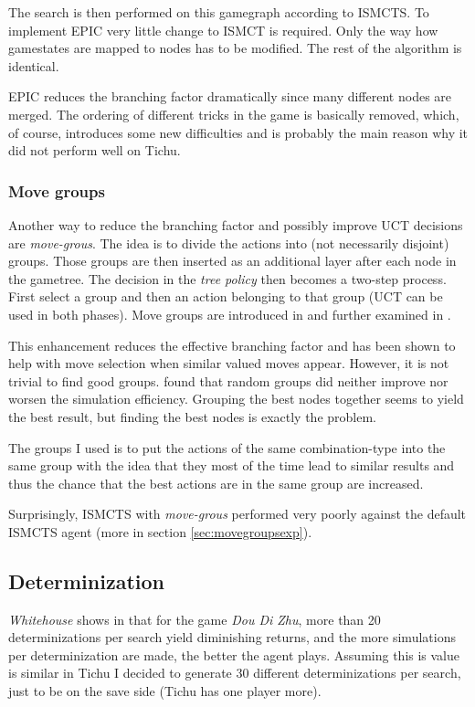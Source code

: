 The search is then performed on this gamegraph according to ISMCTS. To implement EPIC very little change to ISMCT is required. Only the way how gamestates are mapped to nodes has to be modified. The rest of the algorithm is identical.

EPIC reduces the branching factor dramatically since many different nodes are merged. The ordering of different tricks in the game is basically removed, which, of course, introduces some new difficulties and is probably the main reason why it did not perform well on Tichu.

\subsubsection{Move groups}
Another way to reduce the branching factor and possibly improve UCT decisions are \textit{move-grous}.
The idea is to divide the actions into (not necessarily disjoint) groups. Those groups are then inserted as an additional layer after each node in the gametree.
The decision in the \textit{tree policy} then becomes a two-step process. First select a group and then an action belonging to that group (UCT can be used in both phases).
Move groups are introduced in \cite{movegroups} and further examined in \cite{movegroups2}.

This enhancement reduces the effective branching factor and has been shown to help with move selection when similar valued moves appear. However, it is not trivial to find good groups. \cite{movegroups2} found that random groups did neither improve nor worsen the simulation efficiency. Grouping the best nodes together seems to yield the best result, but finding the best nodes is exactly the problem.

The groups I used is to put the actions of the same combination-type into the same group with the idea that they most of the time lead to similar results and thus the chance that the best actions are in the same group are increased.

Surprisingly, ISMCTS with \textit{move-grous} performed very poorly against the default ISMCTS agent (more in section \ref{sec:movegroupsexp}).


\subsection{Determinization}
\textit{Whitehouse} shows in \cite[p.~54+]{whitehouse14} that for the game \textit{Dou Di Zhu}, more than 20 determinizations per search yield diminishing returns, and the more simulations per determinization are made, the better the agent plays.
Assuming this is value is similar in Tichu I decided to generate 30 different determinizations per search, just to be on the save side (Tichu has one player more).



